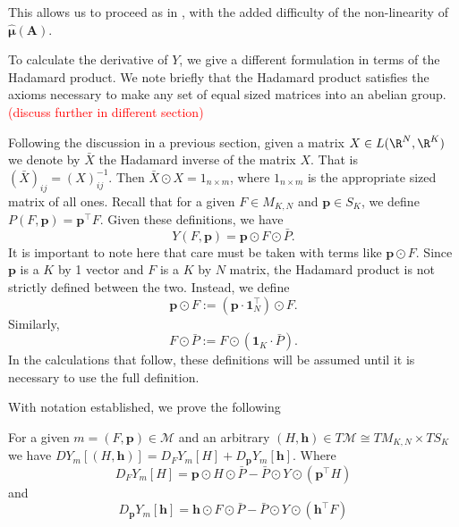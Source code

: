 This allows us to proceed as in \cite{patternnet}, with the added difficulty of the non-linearity of $\hat{\bm\mu}(\bm A)$.

To calculate the derivative of $Y$, we give a different formulation in terms of the Hadamard product.  We note briefly that the Hadamard product satisfies the axioms necessary to make any set of equal sized matrices into an abelian group. \textcolor{red}{(discuss further in different section)}

Following the discussion in a previous section, given a matrix $X\in L(\R^N,\R^K)$ we denote by $\bar{X}$ the Hadamard inverse of the matrix $X$. That is $(\bar{X})_{ij}=(X)_{ij}^{-1}.$  Then $\bar{X}\odot X=1_{n\times m}$, where $1_{n\times m}$ is the appropriate sized matrix of all ones.
Recall that for a given $F\in M_{K,N}$ and $\bm p\in S_K$, we define $P(F,\bm p)=\bm p^{\intercal}F$.  Given these definitions, we have
\[Y(F,\bm p)=\bm p\odot F\odot \bar{P}.\]
It is important to note here that care must be taken with terms like $\bm p\odot F$.  Since $\bm p$ is a $K$ by 1 vector and $F$ is a $K$ by $N$ matrix, the Hadamard product is not strictly defined between the two.  Instead, we define
\[\bm p\odot F:=(\bm p\cdot \bm 1_{N}^{\intercal})\odot F.\]
Similarly, 
\[F\odot \bar{P}:=F \odot (\bm 1_K\cdot \bar{P}).\]
In the calculations that follow, these definitions will be assumed until it is necessary to use the full definition.

With notation established, we prove the following
\begin{thm}\label{DYvec}
For a given $m=(F,\bm p)\in \mathcal{M}$ and an arbitrary $(H,\bm h)\in T\mathcal{M}\cong TM_{K,N}\times TS_K$ we have $DY_{m}[(H,\bm h)]=D_FY_{m}[H]+D_{\bm p}Y_{m}[\bm h]$. Where 
\[D_FY_{m}[H]=\bm p\odot H\odot \bar{P}-\bar{P}\odot Y\odot(\bm p^{\intercal}H)\]
and 
\[D_{\bm p}Y_{m}[\bm h]=\bm h\odot F\odot \bar{P}-\bar{P}\odot Y\odot(\bm h^{\intercal}F)\]
\end{thm}

